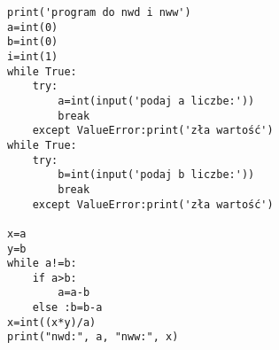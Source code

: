 \begin{verbatim}
print('program do nwd i nww')
a=int(0)
b=int(0)
i=int(1)
while True:
    try:
        a=int(input('podaj a liczbe:'))
        break   
    except ValueError:print('zła wartość')
while True:
    try:
        b=int(input('podaj b liczbe:'))
        break   
    except ValueError:print('zła wartość')

x=a
y=b
while a!=b:
    if a>b:
        a=a-b
    else :b=b-a
x=int((x*y)/a)
print("nwd:", a, "nww:", x)
\end{verbatim}